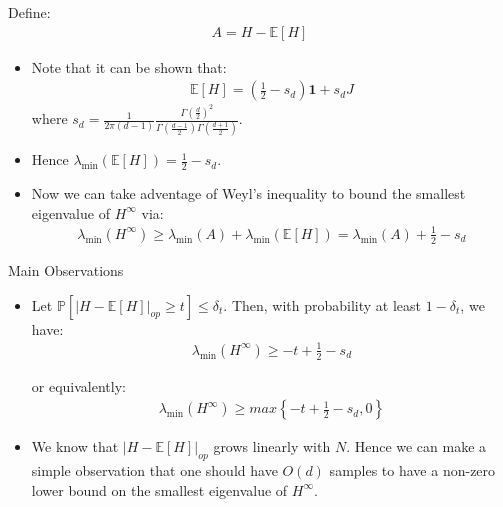 \documentclass[serif, aspectratio=169]{beamer}
\begin{document}
\begin{frame}
	Define:
	\begin{align*}
		A = H - \mathbb{E}[H] 
	\end{align*}
	\begin{itemize}
		\item Note that it can be shown that:
		\begin{align*}
			\mathbb{E}[H] = (\frac{1}{2} -s_d) \mathbf{1} + s_d J
		\end{align*}
		where \( s_d = \frac{1}{2 \pi (d - 1)} \frac{\Gamma \left( \frac{d}{2} \right)^2}{\Gamma \left( \frac{d - 1}{2} \right) \Gamma \left( \frac{d + 1}{2} \right)} \). 
		\item Hence \( \lambda_{\min}(\mathbb{E}[H]) = \frac{1}{2} - s_d \).
		\item Now we can take adventage of Weyl's inequality to bound the smallest eigenvalue of \(H^\infty\) via:
			\begin{align*}
				\lambda_{\min}(H^\infty) \geq \lambda_{\min}(A) + \lambda_{\min}(\mathbb{E}[H]) = \lambda_{\min}(A) + \frac{1}{2} - s_d
			\end{align*}
	\end{itemize}
\end{frame}

\begin{frame}{Main Observations}
	\begin{itemize}
		\item 	Let \( \mathbb{P} \left[ \lvert H - \mathbb{E}[H] \rvert_{op} \geq t \right] \leq \delta_t \). Then, with probability at least \( 1 - \delta_t \), we have:
		\begin{align*}
			\lambda_{\min}(H^\infty) \geq -t + \frac{1}{2} - s_d
		\end{align*}

		or equivalently:
		\begin{align*}
			\lambda_{\min}(H^\infty) \geq max \left\{ -t + \frac{1}{2} - s_d, 0 \right\}
		\end{align*}
		\item We know that \( \lvert H - \mathbb{E}[H] \rvert_{op} \) grows linearly with \( N \). Hence we can make a simple observation that one should have $O(d)$ samples to have a non-zero lower bound on the smallest eigenvalue of \(H^\infty\).
	\end{itemize}


	
\end{frame}
\end{document}
